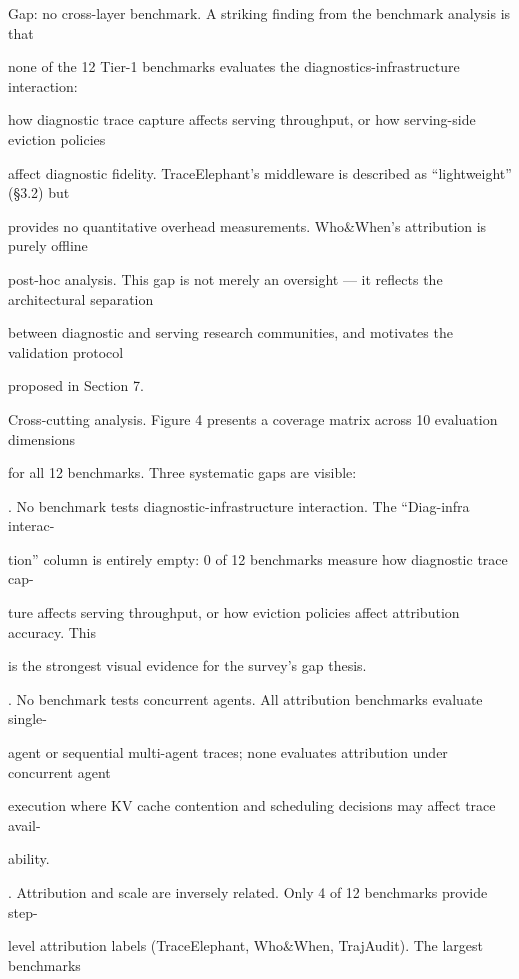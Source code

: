 \begin{flushleft}
\noindent Gap: no cross-layer benchmark. A striking finding from the benchmark analysis is that\par
\noindent none of the 12 Tier-1 benchmarks evaluates the diagnostics-infrastructure interaction:\par
\noindent how diagnostic trace capture affects serving throughput, or how serving-side eviction policies\par
\noindent affect diagnostic fidelity. TraceElephant’s middleware is described as “lightweight” (§3.2) but\par
\noindent provides no quantitative overhead measurements. Who\&When’s attribution is purely offline\par
\noindent post-hoc analysis. This gap is not merely an oversight — it reflects the architectural separation\par
\noindent between diagnostic and serving research communities, and motivates the validation protocol\par
\noindent proposed in Section 7.\par
\par\smallskip
\noindent Cross-cutting analysis. Figure 4 presents a coverage matrix across 10 evaluation dimensions\par
\noindent for all 12 benchmarks. Three systematic gaps are visible:\par
{}. No benchmark tests diagnostic-infrastructure interaction. The “Diag-infra interac-\par
\noindent  tion” column is entirely empty: 0 of 12 benchmarks measure how diagnostic trace cap-\par
\noindent  ture affects serving throughput, or how eviction policies affect attribution accuracy. This\par
\noindent  is the strongest visual evidence for the survey’s gap thesis.\par
{}. No benchmark tests concurrent agents. All attribution benchmarks evaluate single-\par
\noindent  agent or sequential multi-agent traces; none evaluates attribution under concurrent agent\par
\noindent  execution where KV cache contention and scheduling decisions may affect trace avail-\par
\noindent  ability.\par
{}. Attribution and scale are inversely related. Only 4 of 12 benchmarks provide step-\par
\noindent  level attribution labels (TraceElephant, Who\&When, TrajAudit). The largest benchmarks\par

\end{flushleft}

